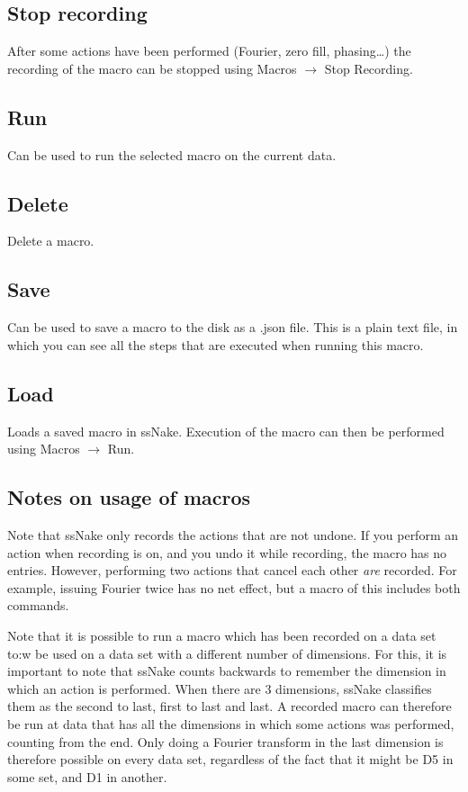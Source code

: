 \documentclass[11pt,a4paper]{article}
\begin{document}
\subsection{Stop recording}
After some actions have been performed (Fourier, zero fill, phasing\ldots   ) the recording of the macro can be stopped using Macros $\rightarrow$ Stop Recording. 

\subsection{Run}
Can be used to run the selected macro on the current data.

\subsection{Delete}
Delete a macro.

\subsection{Save}
Can be used to save a macro to the disk as a .json file. This is a plain text file, in which you can see all the steps that are executed when running this macro.

\subsection{Load}
Loads a saved macro in ssNake. Execution of the macro can then be performed using Macros $\rightarrow$ Run.

\subsection{Notes on usage of macros}
Note that ssNake only records the actions that are not undone. If you perform an action when recording is on, 
and you undo it while recording, the macro has no entries. However, performing two actions that cancel each other
\textit{are} recorded. For example, issuing Fourier twice has no net effect, but a macro of this includes both commands.

Note that it is possible to run a macro which has been recorded on a data set to:w
be used on a data set with a different number of dimensions.
For this, it is important to note that ssNake counts backwards to remember the dimension in which an action is performed. When there are 3 dimensions,
ssNake classifies them as the second to last, first to last and last. A recorded macro can therefore be run at data that has all the dimensions in which some actions was performed,
counting from the end. Only doing a Fourier transform in the last dimension is therefore possible on every data set, regardless of the fact that it might be D5 in some set,
and D1 in another.
\end{document}
